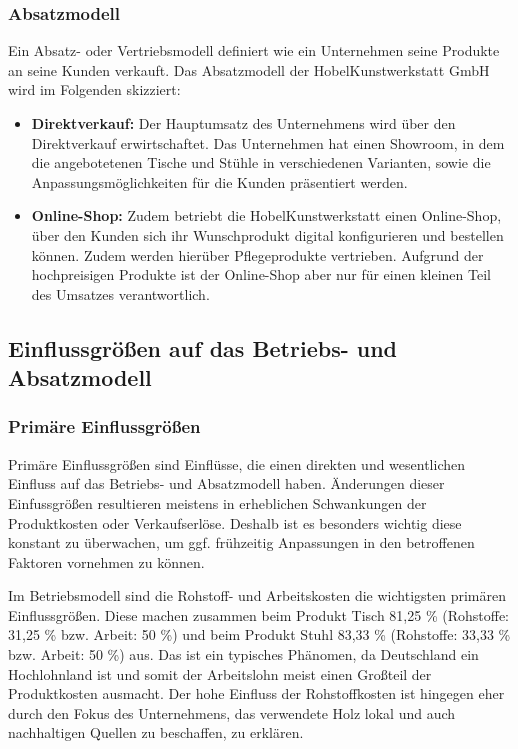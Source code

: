 \subsubsection{Absatzmodell}

Ein Absatz- oder Vertriebsmodell definiert wie ein Unternehmen seine Produkte an seine Kunden verkauft. Das Absatzmodell der HobelKunstwerkstatt GmbH wird im Folgenden skizziert:

\begin{itemize}
    \item \textbf{Direktverkauf:} Der Hauptumsatz des Unternehmens wird über den Direktverkauf erwirtschaftet. Das Unternehmen hat einen Showroom, in dem die angebotetenen Tische und Stühle in verschiedenen Varianten, sowie die Anpassungsmöglichkeiten für die Kunden präsentiert werden.
    \item \textbf{Online-Shop:} Zudem betriebt die HobelKunstwerkstatt einen Online-Shop, über den Kunden sich ihr Wunschprodukt digital konfigurieren und bestellen können. Zudem werden hierüber Pflegeprodukte vertrieben. Aufgrund der hochpreisigen Produkte ist der Online-Shop aber nur für einen kleinen Teil des Umsatzes verantwortlich.
\end{itemize}

\subsection{Einflussgrößen auf das Betriebs- und Absatzmodell}

\subsubsection{Primäre Einflussgrößen}

Primäre Einflussgrößen sind Einflüsse, die einen direkten und wesentlichen Einfluss auf das Betriebs- und Absatzmodell haben. Änderungen dieser Einfussgrößen resultieren meistens in erheblichen Schwankungen \zB der Produktkosten oder Verkaufserlöse. Deshalb ist es besonders wichtig diese konstant zu überwachen, um ggf. frühzeitig Anpassungen in den betroffenen Faktoren vornehmen zu können.

Im Betriebsmodell sind die Rohstoff- und Arbeitskosten die wichtigsten primären Einflussgrößen. Diese machen zusammen beim Produkt Tisch 81,25 \% (Rohstoffe: 31,25 \% bzw. Arbeit: 50 \%) und beim Produkt Stuhl 83,33 \% (Rohstoffe: 33,33 \% bzw. Arbeit: 50 \%) aus. Das ist ein typisches Phänomen, da Deutschland ein Hochlohnland ist und somit der Arbeitslohn meist einen Großteil der Produktkosten ausmacht. Der hohe Einfluss der Rohstoffkosten ist hingegen eher durch den Fokus des Unternehmens, das verwendete Holz lokal und auch nachhaltigen Quellen zu beschaffen, zu erklären.

